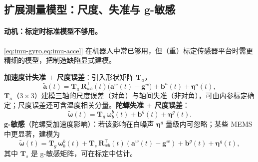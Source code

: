 \subsection{扩展测量模型：尺度、失准与 g-敏感}
\label{subsec:imu-ext-model}

\paragraph{动机：标定时标准模型不够用。}
\cref{eq:imu-gyro,eq:imu-accel} 在机器人中常已够用，但（重）标定传感器平台时需更精细的模型，把制造缺陷显式建模。

\textbf{加速度计失准 $+$ 尺度误差}：引入形状矩阵 $\mathbf T_a$，
\begin{equation}
  \tilde{\mathbf a}(t)=\mathbf T_a\,\mathbf R_{wb}^\top(t)\big(\mathbf a^w(t)-\mathbf g^w\big)+\mathbf b^a(t)+\boldsymbol\eta^a(t),
  \label{eq:imu-accel-ext}
\end{equation}
$\mathbf T_a$（$3\times3$）建模三轴的尺度误差（对角）与轴间失准（非对角），可由内参标定确定；尺度误差还可含温度相关分量\cite{carlone2026handbook}。\textbf{陀螺失准 $+$ 尺度误差}：
\begin{equation}
  \tilde{\boldsymbol\omega}(t)=\mathbf T_g\,\boldsymbol\omega_b^b(t)+\mathbf b^g(t)+\boldsymbol\eta^g(t).
  \label{eq:imu-gyro-ext}
\end{equation}
\textbf{g-敏感}（陀螺受加速度影响）：若该影响在白噪声 $\boldsymbol\eta^g$ 量级内可忽略；某些 MEMS 中更显著，建模为
\begin{equation}
  \tilde{\boldsymbol\omega}(t)=\mathbf T_g\,\boldsymbol\omega_b^b(t)+\mathbf T_s\,\mathbf R_{wb}^\top(t)(\mathbf a^w(t)-\mathbf g^w)+\mathbf b^g(t)+\boldsymbol\eta^g(t),
  \label{eq:imu-gsens}
\end{equation}
其中 $\mathbf T_s$ 是 g-敏感矩阵，可在标定中估计\cite{carlone2026handbook}。

